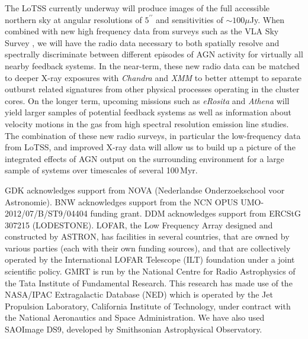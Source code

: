 \documentclass{aa}  %
\begin{document}
The LoTSS currently underway will produce images of the full accessible northern sky at angular resolutions of $5^{\prime\prime}$ and sensitivities of $\sim100\mu$Jy. When combined with new high frequency data from surveys such as the VLA Sky Survey \citep[VLASS;][]{VLASS2013}, we will have the radio data necessary to both spatially resolve and spectrally discriminate between different episodes of AGN activity for virtually all nearby feedback systems. In the near-term, these new radio data can be matched to deeper X-ray exposures with \textit{Chandra} and \textit{XMM} to better attempt to separate outburst related signatures from other physical processes operating in the cluster cores. On the longer term, upcoming missions such as \textit{eRosita} \citep{eRosita2012} and \textit{Athena} \citep{Athena2013} will yield larger samples of potential feedback systems as well as information about velocity motions in the gas from high spectral resolution emission line studies. The combination of these new radio surveys, in particular the low-frequency data from LoTSS, and improved X-ray data will allow us to build up a picture of the integrated effects of AGN output on the surrounding environment for a large sample of systems over timescales of several 100\,Myr. 













\begin{acknowledgements}

GDK acknowledges support from NOVA (Nederlandse Onderzoekschool voor Astronomie).
BNW acknowledges support from the NCN OPUS UMO-2012/07/B/ST9/04404 funding grant.
DDM acknowledges support from ERCStG 307215 (LODESTONE).
LOFAR, the Low Frequency Array designed and constructed by ASTRON, has facilities in several countries, that are owned by various parties (each with their own funding sources), and that are collectively operated by the International LOFAR Telescope (ILT) foundation under a joint scientific policy. 
GMRT is run by the National Centre for Radio Astrophysics of the Tata Institute of Fundamental Research.
This research has made use of the NASA/IPAC Extragalactic Database (NED) which is operated by the Jet Propulsion Laboratory, California Institute of Technology, under contract with the National Aeronautics and Space Administration. 
We have also used SAOImage DS9, developed by Smithsonian Astrophysical Observatory. 
        
\end{acknowledgements}
\end{document}
